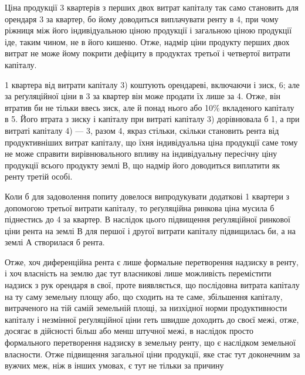 Ціна продукції 3 квартерів з перших двох витрат капіталу так само
становить для орендаря 3 за квартер, бо йому доводиться виплачувати
ренту в 4, при чому ріжниця між його індивідуальною ціною продукції
і загальною ціною продукції іде, таким чином, не в його кишеню. Отже,
надмір ціни продукту перших двох витрат не може йому покрити дефіциту
в продуктах третьої і четвертої витрати капіталу.

1 квартера від витрати капіталу 3) коштують орендареві, включаючи
і зиск, 6; але за реґуляційної ціни в 3 за квартер він може
продати їх лише за 4. Отже, він втратив би не тільки ввесь
зиск, але й понад нього  або  10\% вкладеного капіталу в 5.
Його втрата з зиску і капіталу при витраті капіталу 3) дорівнювала б  1, а при витраті капіталу 4) — 3, разом 4, якраз
стільки, скільки становить рента від продуктивніших витрат капіталу, що їхня
індивідуальна ціна продукції саме тому не може справити вирівнювального
впливу на індивідуальну пересічну ціну продукції всього продукту землі $В$, що
надмір його доводиться виплатити як ренту третій особі.

Коли б для задоволення попиту довелося випродукувати додаткові 1
квартери з допомогою третьої витрати капіталу, то реґуляційна ринкова ціна
мусила б піднестись до 4 за квартер. В наслідок цього підвищення
реґуляційної ринкової ціни рента на землі $В$ для першої і другої витрати капіталу
підвищилась би, а на землі $А$ створилася б рента.

Отже, хоч диференційна рента є лише формальне перетворення надзиску
в ренту, і хоч власність на землю дає тут власникові лише можливість перемістити
надзиск з рук орендаря в свої, проте виявляється, що послідовна витрата
капіталу на ту саму земельну площу або, що сходить на те саме, збільшення
капіталу, витраченого на тій самій земельній площі, за низхідної норми
продуктивности капіталу і незмінної реґуляційної ціни геть швидше доходить
до своєї межі, отже, досягає в дійсності більш або менш штучної межі, в наслідок
просто формального перетворення надзиску в земельну ренту, що є наслідком
земельної власности. Отже підвищення загальної ціни продукції, яке стає
тут доконечним за вужчих меж, ніж в інших умовах, є тут не тільки за причину
\parbreak{}  %
